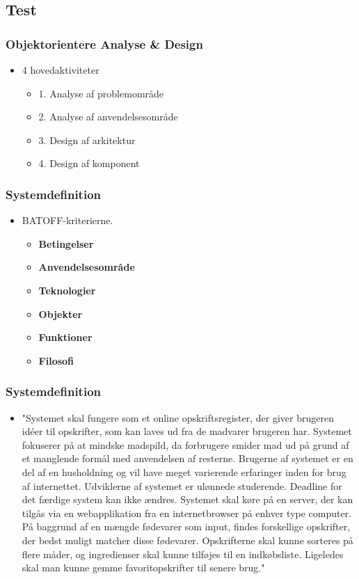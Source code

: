 \subsection{Test}
	\begin{frame}
		\frametitle{Objektorientere Analyse \& Design}
		\begin{itemize}
			\item 4 hovedaktiviteter
			\begin{itemize}
				\item 1. Analyse af problemområde
				\item 2. Analyse af anvendelsesområde
				\item 3. Design af arkitektur
				\item 4. Design af komponent
			\end{itemize}
		\end{itemize}
	\end{frame}
	
	\begin{frame}
		\frametitle{Systemdefinition}
		\begin{itemize}
			\item  BATOFF-kriterierne.
				\begin{itemize}
				\item  \bf{B}etingelser
				\item  \bf{A}nvendelsesområde
				\item  \bf{T}eknologier
				\item  \bf{O}bjekter
				\item  \bf{F}unktioner
				\item  \bf{F}ilosofi
				\end{itemize}
		\end{itemize}
	\end{frame}
		
	\begin{frame}
		\frametitle{Systemdefinition}
		\begin{itemize}
			\item  "Systemet skal fungere som et online opskriftsregister, der giver brugeren idéer til opskrifter, 
				   som kan laves ud fra de madvarer brugeren har. Systemet fokuserer på at mindske madspild, da 
				   forbrugere smider mad ud på grund af et manglende formål med anvendelsen af resterne. 
				   Brugerne af systemet er en del af en husholdning og vil have meget varierende erfaringer inden 
				   for brug af internettet. Udviklerne af systemet er ulønnede studerende. Deadline for det færdige 
				   system kan ikke ændres. Systemet skal køre på en server, der kan tilgås via en webapplikation 
				   fra en internetbrowser på enhver type computer. På baggrund af en mængde fødevarer som input, 
				   findes forskellige opskrifter, der bedst muligt matcher disse fødevarer. Opskrifterne skal kunne 
				   sorteres på flere måder, og ingredienser skal kunne tilføjes til en indkøbsliste. Ligeledes skal 
				   man kunne gemme favoritopskrifter til senere brug."
		\end{itemize}
	\end{frame}